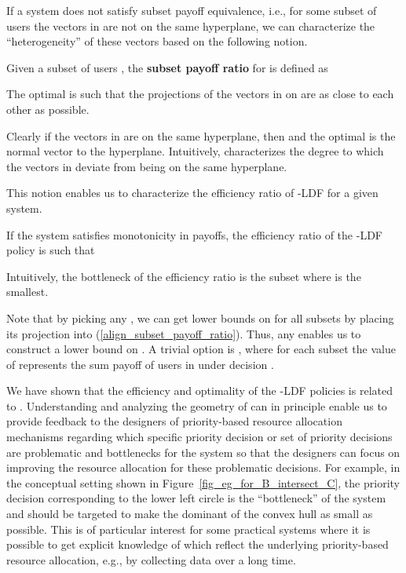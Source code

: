 \documentclass[prodmode,acmtompecs]{acmsmall}
\newcommand{\myComments}[1]{}
\newif\ifinfocom
\newif\ifextended
\newif\ifdissertation
\newcommand{\infocomStart}{\ifinfocom \myComments{Infocom: }}
\newcommand{\extendedStart}{\ifextended  \myComments{Extended version: }}
\newcommand{\dissertationStart}{\ifdissertation  \myComments{Dissertation version: }}
\newcommand{\commentEnd}{\myComments{End}}
\begin{document}
If a system does not satisfy subset payoff equivalence, i.e., for some subset of users  the vectors in  are not on the same hyperplane, we can characterize the ``heterogeneity'' of these vectors based on the following notion. 

\begin{definition}
Given a subset of users , the {\bf subset payoff ratio}  for  is defined as

\end{definition}
The optimal  is such that the projections of the vectors in  on  are as close to each other as possible. 

Clearly if the vectors in  are on the same hyperplane, then  and the optimal  is the normal vector to the hyperplane. Intuitively,  characterizes the degree to which the vectors in  deviate from being on the same hyperplane. 

This notion enables us to characterize the efficiency ratio of -LDF for a given system. 

\begin{theorem}
\label{thm_efficiency_ratio}
If the system satisfies monotonicity in payoffs, the efficiency ratio of the -LDF policy is such that

\end{theorem}

\infocomStart
See the extended version of this paper \cite{EXT2} for the proof. 
\commentEnd\fi
\extendedStart
\noindent See Appendix \ref{appendix_pf_thm_efficiency_ratio} for the proof. 
\commentEnd\fi
Intuitively, the bottleneck of the efficiency ratio is the subset  where  is the smallest. 

Note that by picking any , we can get lower bounds on  for all subsets  by placing its projection  into (\ref{align_subset_payoff_ratio}). Thus, any  enables us to construct a lower bound on . A trivial option is , where for each subset  the value of  represents the sum payoff of users in  under decision . 
\dissertationStart
In the sequel we will consider specific resource and user models in SRT context and explore other options of  to evaluate -LDF's efficiency. 
\commentEnd\fi

We have shown that the efficiency and optimality of the -LDF policies is related to . 
Understanding and analyzing the geometry of  can in principle enable us to provide feedback to the designers of priority-based resource allocation mechanisms regarding which specific priority decision or set of priority decisions are problematic and bottlenecks for the system so that the designers can focus on improving the resource allocation for these problematic decisions. 
For example, in the conceptual setting shown in Figure~{\ref{fig_eg_for_B_intersect_C}}, the priority decision corresponding to the lower left circle is the ``bottleneck'' of the system and should be targeted to make the dominant of the convex hull as small as possible. 
This is of particular interest for some practical systems where it is possible to get explicit knowledge of  which reflect the underlying priority-based resource allocation, e.g., by collecting data over a long time. 
\end{document}
